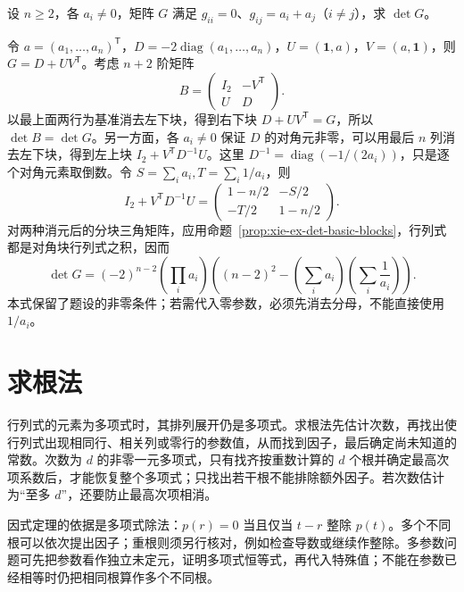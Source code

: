 \begin{example}
\label{ex:xie-ex-det-offdiagonal-sums}
设 $n\geq2$，各 $a_i\ne0$，矩阵 $G$ 满足 $g_{ii}=0$、$g_{ij}=a_i+a_j$（$i\ne j$），求 $\det G$。
\end{example}

\begin{solve}
令 $a=(a_1,\ldots,a_n)^{\mathsf T}$，$D=-2\operatorname{diag}(a_1,\ldots,a_n)$，$U=(\mathbf1,a)$，$V=(a,\mathbf1)$，则 $G=D+UV^{\mathsf T}$。考虑 $n+2$ 阶矩阵
\[
B=\begin{pmatrix}I_2&-V^{\mathsf T}\\U&D\end{pmatrix}.
\]
以最上面两行为基准消去左下块，得到右下块 $D+UV^{\mathsf T}=G$，所以 $\det B=\det G$。另一方面，各 $a_i\ne0$ 保证 $D$ 的对角元非零，可以用最后 $n$ 列消去左下块，得到左上块 $I_2+V^{\mathsf T}D^{-1}U$。这里 $D^{-1}=\operatorname{diag}(-1/(2a_i))$，只是逐个对角元素取倒数。令 $S=\sum_i a_i,T=\sum_i1/a_i$，则
\[
I_2+V^{\mathsf T}D^{-1}U
=\begin{pmatrix}1-n/2&-S/2\\-T/2&1-n/2\end{pmatrix}.
\]
对两种消元后的分块三角矩阵，应用命题~\ref{prop:xie-ex-det-basic-blocks}，行列式都是对角块行列式之积，因而
\begin{equation}
\label{eq:xie-ex-det-offdiagonal-sums}
\det G=(-2)^{n-2}\left(\prod_i a_i\right)
\left((n-2)^2-\left(\sum_i a_i\right)\left(\sum_i\frac1{a_i}\right)\right).
\end{equation}
本式保留了题设的非零条件；若需代入零参数，必须先消去分母，不能直接使用 $1/a_i$。
\end{solve}

\section{求根法}
\label{sec:xie-ex-det-polynomial-roots}

行列式的元素为多项式时，其排列展开仍是多项式。求根法先估计次数，再找出使行列式出现相同行、相关列或零行的参数值，从而找到因子，最后确定尚未知道的常数。次数为 $d$ 的非零一元多项式，只有找齐按重数计算的 $d$ 个根并确定最高次项系数后，才能恢复整个多项式；只找出若干根不能排除额外因子。若次数估计为“至多 $d$”，还要防止最高次项相消。

因式定理的依据是多项式除法：$p(r)=0$ 当且仅当 $t-r$ 整除 $p(t)$。多个不同根可以依次提出因子；重根则须另行核对，例如检查导数或继续作整除。多参数问题可先把参数看作独立未定元，证明多项式恒等式，再代入特殊值；不能在参数已经相等时仍把相同根算作多个不同根。

